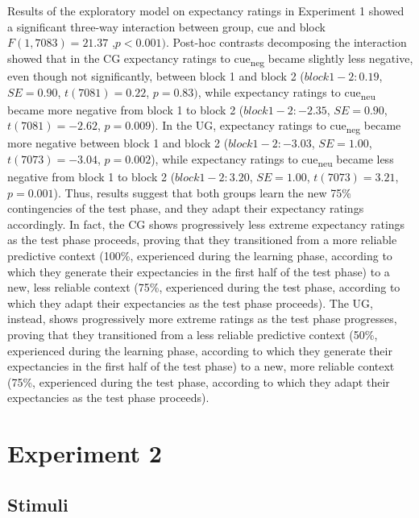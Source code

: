 \documentclass[
]{article}
\begin{document}
Results of the exploratory model on expectancy ratings in Experiment 1 showed a significant three-way interaction between group, cue and block \(F(1, 7083) = 21.37\) ,\(p < 0.001)\). Post-hoc contrasts decomposing the interaction showed that in the CG expectancy ratings to cue\textsubscript{neg} became slightly less negative, even though not significantly, between block 1 and block 2 (\(block 1-2: 0.19\), \(SE = 0.90\), \(t(7081) = 0.22\), \(p = 0.83)\), while expectancy ratings to cue\textsubscript{neu} became more negative from block 1 to block 2 (\(block 1-2: -2.35\), \(SE = 0.90\), \(t(7081) = -2.62\), \(p = 0.009\)). In the UG, expectancy ratings to cue\textsubscript{neg} became more negative between block 1 and block 2 (\(block 1-2: -3.03\), \(SE = 1.00\), \(t(7073) = -3.04\), \(p = 0.002\)), while expectancy ratings to cue\textsubscript{neu} became less negative from block 1 to block 2 (\(block 1-2: 3.20\), \(SE = 1.00\), \(t(7073) = 3.21\), \(p = 0.001\)).
Thus, results suggest that both groups learn the new 75\% contingencies of the test phase, and they adapt their expectancy ratings accordingly. In fact, the CG shows progressively less extreme expectancy ratings as the test phase proceeds, proving that they transitioned from a more reliable predictive context (100\%, experienced during the learning phase, according to which they generate their expectancies in the first half of the test phase) to a new, less reliable context (75\%, experienced during the test phase, according to which they adapt their expectancies as the test phase proceeds). The UG, instead, shows progressively more extreme ratings as the test phase progresses, proving that they transitioned from a less reliable predictive context (50\%, experienced during the learning phase, according to which they generate their expectancies in the first half of the test phase) to a new, more reliable context (75\%, experienced during the test phase, according to which they adapt their expectancies as the test phase proceeds).

\hypertarget{experiment-2}{%
\section{Experiment 2}\label{experiment-2}}

\hypertarget{stimuli-1}{%
\subsection{Stimuli}\label{stimuli-1}}
\end{document}
